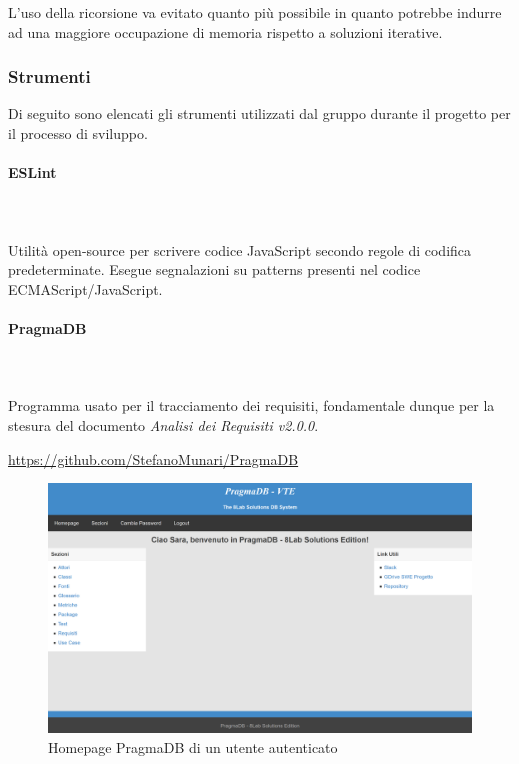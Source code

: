 L'uso della ricorsione va evitato quanto più possibile in  quanto potrebbe
indurre ad una maggiore occupazione di memoria rispetto a soluzioni iterative.
	
\subsubsection{Strumenti}
Di seguito sono elencati gli strumenti utilizzati dal gruppo durante il 
progetto per il processo di sviluppo.
		
\paragraph{ESLint} \mbox{}\\ \mbox{}\\
Utilità open-source per scrivere codice JavaScript secondo regole di codifica 
predeterminate. Esegue segnalazioni su patterns presenti nel codice 
ECMAScript/JavaScript.
		
\paragraph{PragmaDB} \mbox{}\\ \mbox{}\\
Programma usato per il tracciamento dei requisiti, fondamentale dunque per la 
stesura del documento \textit{Analisi dei Requisiti v2.0.0}. \newline
\centerline{\url{https://github.com/StefanoMunari/PragmaDB}}
	\begin{figure}[H]
		\includegraphics[width=0.99\linewidth]{res/images/HomepagePragmaDB.png}
		\caption{Homepage PragmaDB di un utente autenticato}
	\end{figure}
		
